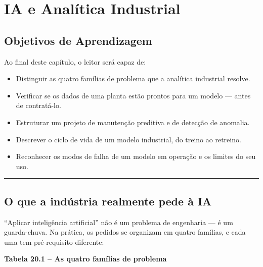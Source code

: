 \chapter{IA e Analítica Industrial}\label{ia-e-analuxedtica-industrial}

\section*{Objetivos de Aprendizagem}

Ao final deste capítulo, o leitor será capaz de:

\begin{itemize}
\tightlist
\item
  Distinguir as quatro famílias de problema que a analítica industrial resolve.
\item
  Verificar se os dados de uma planta estão prontos para um modelo --- antes de contratá-lo.
\item
  Estruturar um projeto de manutenção preditiva e de detecção de anomalia.
\item
  Descrever o ciclo de vida de um modelo industrial, do treino ao retreino.
\item
  Reconhecer os modos de falha de um modelo em operação e os limites do seu uso.
\end{itemize}

\begin{center}\rule{0.5\linewidth}{0.5pt}\end{center}

\section{O que a indústria realmente pede à IA}\label{o-que-a-induxfastria-realmente-pede-uxe0-ia}

``Aplicar inteligência artificial'' não é um problema de engenharia --- é um guarda-chuva. Na prática, os
pedidos se organizam em quatro famílias, e cada uma tem pré-requisito diferente:

\textbf{Tabela 20.1 -- As quatro famílias de problema}

